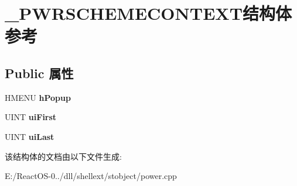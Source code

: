 \hypertarget{struct___p_w_r_s_c_h_e_m_e_c_o_n_t_e_x_t}{}\section{\+\_\+\+P\+W\+R\+S\+C\+H\+E\+M\+E\+C\+O\+N\+T\+E\+X\+T结构体 参考}
\label{struct___p_w_r_s_c_h_e_m_e_c_o_n_t_e_x_t}
\subsection*{Public 属性}
\begin{DoxyCompactItemize}
\item 
\mbox{\label{struct___p_w_r_s_c_h_e_m_e_c_o_n_t_e_x_t_a681d0d96ec26e2511c2bc384af6b603b}} 
H\+M\+E\+NU {\bfseries h\+Popup}
\item 
\mbox{\label{struct___p_w_r_s_c_h_e_m_e_c_o_n_t_e_x_t_a118f8912114160a0f128421be4758150}} 
U\+I\+NT {\bfseries ui\+First}
\item 
\mbox{\label{struct___p_w_r_s_c_h_e_m_e_c_o_n_t_e_x_t_a4d72ea2618e6115428cce203f809d92d}} 
U\+I\+NT {\bfseries ui\+Last}
\end{DoxyCompactItemize}


该结构体的文档由以下文件生成\+:\begin{DoxyCompactItemize}
\item 
E\+:/\+React\+O\+S-\/0../dll/shellext/stobject/power.\+cpp\end{DoxyCompactItemize}
